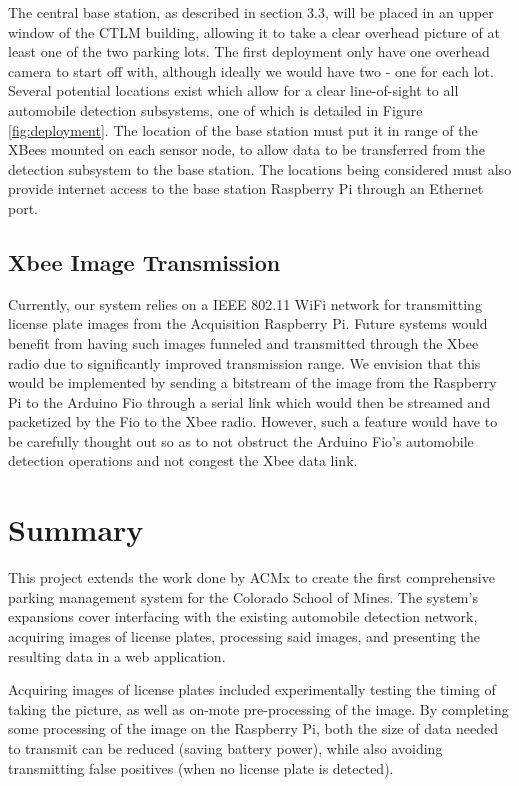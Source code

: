 \documentclass[11pt, oneside, fullpage, doublespace]{article}
\begin{document}
The central base station, as described in section 3.3, will be placed in an upper window of the CTLM building, allowing it to take a clear overhead picture of at least one of the two parking lots. The first deployment only have one overhead camera to start off with, although ideally we would have two - one for each lot. Several potential locations exist which allow for a clear line-of-sight to all automobile detection subsystems, one of which is detailed in Figure \ref{fig:deployment}. The location of the base station must put it in range of the XBees mounted on each sensor node, to allow data to be transferred from the detection subsystem to the base station. The locations being considered must also provide internet access to the base station Raspberry Pi through an Ethernet port.

\subsection{Xbee Image Transmission}
Currently, our system relies on a IEEE 802.11 WiFi network for transmitting license plate images from the Acquisition Raspberry Pi. Future systems would benefit from having such images funneled and transmitted through the Xbee radio due to significantly improved transmission range. We envision that this would be implemented by sending a bitstream of the image from the Raspberry Pi to the Arduino Fio through a serial link which would then be streamed and packetized by the Fio to the Xbee radio. However, such a feature would have to be carefully thought out so as to not obstruct the Arduino Fio's automobile detection operations and not congest the Xbee data link.

\section{Summary}

This project extends the work done by ACMx to create the first comprehensive parking management system for the Colorado School of Mines. The system's expansions cover interfacing with the existing automobile detection network, acquiring images of license plates, processing said images, and presenting the resulting data in a web application.

Acquiring images of license plates included experimentally testing the timing of taking the picture, as well as on-mote pre-processing of the image. By completing some processing of the image on the Raspberry Pi, both the size of data needed to transmit can be reduced (saving battery power), while also avoiding transmitting false positives (when no license plate is detected).
\end{document}

